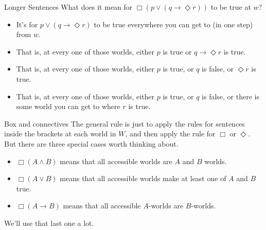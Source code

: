 \documentclass[
  14pt,
  letterpaper,
  ignorenonframetext,
  aspectratio=169,
]{beamer}
\providecommand{\tightlist}{%
  \setlength{\itemsep}{0pt}\setlength{\parskip}{0pt}}\usepackage{longtable,booktabs,array}
\begin{document}
\begin{frame}{Longer Sentences}
\protect\hypertarget{longer-sentences}{}
What does it mean for \(\Box(p \vee (q \rightarrow \Diamond r))\) to be
true at \(w\)?

\begin{itemize}[<+->]
\tightlist
\item
  It's for \(p \vee (q \rightarrow \Diamond r)\) to be true everywhere
  you can get to (in one step) from \(w\).
\item
  That is, at every one of those worlds, either \(p\) is true or
  \(q \rightarrow \Diamond r\) is true.
\item
  That is, at every one of those worlds, either \(p\) is true, or \(q\)
  is false, or \(\Diamond r\) is true.
\item
  That is, at every one of those worlds, either \(p\) is true, or \(q\)
  is false, or there is some world you can get to where \(r\) is true.
\end{itemize}
\end{frame}

\begin{frame}{Box and connectives}
\protect\hypertarget{box-and-connectives}{}
The general rule is just to apply the rules for sentences inside the
brackets at each world in \(W\), and then apply the rule for \(\Box\) or
\(\Diamond\). But there are three special cases worth thinking about.

\begin{itemize}[<+->]
\tightlist
\item
  \(\Box(A \wedge B)\) means that all accessible worlds are \(A\) and
  \(B\) worlds.
\item
  \(\Box(A \vee B)\) means that all accessible worlds make at least one
  of \(A\) and \(B\) true.
\item
  \(\Box(A \rightarrow B)\) means that all accessible \(A\)-worlds are
  \(B\)-worlds.
\end{itemize}

We'll use that last one a lot.
\end{frame}
\end{document}
